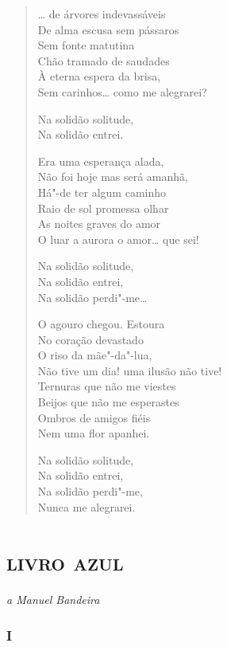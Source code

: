 {\begin{verse}
\ldots{} de árvores indevassáveis\\
De alma escusa sem pássaros\\
Sem fonte matutina\\
Chão tramado de saudades\\
À eterna espera da brisa,\\
Sem carinhos\ldots{} como me alegrarei?

Na solidão solitude,\\
Na solidão entrei.

Era uma esperança alada,\\
Não foi hoje mas será amanhã,\\
Há"-de ter algum caminho\\
Raio de sol promessa olhar\\
As noites graves do amor\\
O luar a aurora o amor\ldots{} que sei!

Na solidão solitude,\\
Na solidão entrei,\\
Na solidão perdi"-me\ldots{}

O agouro chegou. Estoura\\
No coração devastado\\
O riso da mãe"-da"-lua,\\
Não tive um dia! uma ilusão não tive!\\
Ternuras que não me viestes\\
Beijos que não me esperastes\\
Ombros de amigos fiéis\\
Nem uma flor apanhei.

Na solidão solitude,\\
Na solidão entrei,\\
Na solidão perdi"-me,\\
Nunca me alegrarei.
\end{verse}

\movetooddpage
\part{\textsc{livro azul}}


\begin{flushright}
\emph{a Manuel Bandeira}
\end{flushright}

\section*{I}

}
